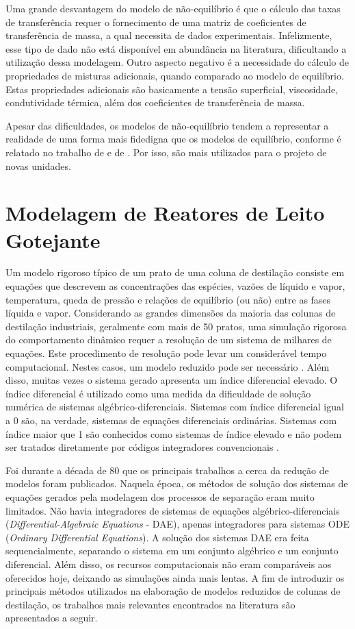 Uma grande desvantagem do modelo de não-equilíbrio é que o cálculo das taxas de
transferência requer o fornecimento de uma matriz de coeficientes de
transferência de massa, a qual necessita de dados experimentais. Infelizmente, esse
tipo de dado não está disponível em abundância na literatura, dificultando a utilização dessa modelagem.
Outro aspecto negativo é a necessidade do cálculo de propriedades de
misturas adicionais, quando comparado ao modelo de equilíbrio.
Estas propriedades adicionais são basicamente a tensão superficial,
viscosidade, condutividade térmica, além dos coeficientes de transferência de
massa.

Apesar das dificuldades, os modelos de não-equilíbrio tendem a representar a realidade de uma forma mais fidedigna que os
modelos de equilíbrio, conforme é relatado no trabalho de  e de . Por isso,
são mais utilizados para o projeto de novas unidades.

\section{Modelagem de Reatores de Leito Gotejante} \label{sec:modred}
Um modelo rigoroso típico de um prato de uma coluna de destilação consiste em equações que descrevem as
concentrações das espécies, vazões de líquido e vapor, temperatura, queda de pressão e relações de
equilíbrio (ou não) entre as
fases líquida e vapor. Considerando as grandes dimensões da maioria das colunas de destilação industriais, geralmente
com mais de 50 pratos, uma simulação rigorosa do comportamento dinâmico requer a resolução de um sistema de milhares
de equações. Este procedimento de resolução pode levar um considerável tempo computacional. Nestes casos, um modelo
reduzido pode ser necessário \cite{Musch:1993}. Além disso, muitas vezes o sistema
gerado apresenta um índice diferencial elevado. O índice diferencial é utilizado como uma medida da dificuldade de
solução numérica de sistemas algébrico-diferenciais. Sistemas com índice diferencial igual a 0 são, na verdade,
sistemas de equações diferenciais ordinárias. Sistemas com índice maior que 1 são conhecidos como sistemas de índice
elevado e não podem ser tratados diretamente por códigos integradores convencionais \cite{Brennan:1989}.

Foi durante a década de 80 que os principais trabalhos a cerca da redução de modelos foram publicados. Naquela época, os
métodos de solução dos sistemas de equações gerados pela modelagem dos processos de separação eram muito limitados. Não
havia integradores de sistemas de equações algébrico-diferenciais (\emph{Differential-Algebraic Equations} - DAE), apenas
integradores para sistemas ODE (\emph{Ordinary Differential Equations}). A solução dos sistemas DAE era feita
sequencialmente, separando o sistema em um conjunto algébrico e um conjunto diferencial. Além disso, os recursos
computacionais não eram comparáveis aos oferecidos hoje, deixando as simulações ainda mais lentas.
A fim de introduzir os principais métodos utilizados na elaboração de modelos reduzidos de colunas de destilação, os
trabalhos mais relevantes encontrados na literatura são apresentados a seguir.

